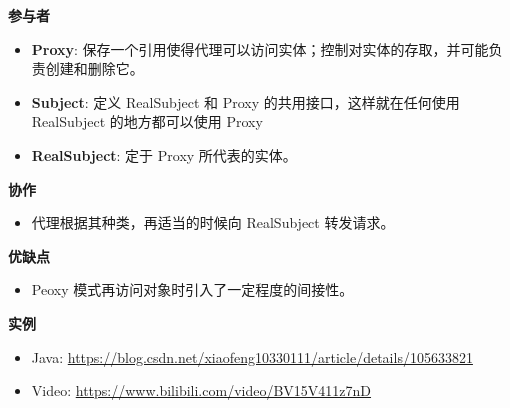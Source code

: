 \noindent\textbf{参与者}

\begin{itemize}
    \item \textbf{Proxy}: 保存一个引用使得代理可以访问实体；控制对实体的存取，并可能负责创建和删除它。
    \item \textbf{Subject}: 定义 RealSubject 和 Proxy 的共用接口，这样就在任何使用 RealSubject 的地方都可以使用 Proxy
    \item \textbf{RealSubject}: 定于 Proxy 所代表的实体。
\end{itemize}

\noindent\textbf{协作}

\begin{itemize}
    \item 代理根据其种类，再适当的时候向 RealSubject 转发请求。
\end{itemize}

\noindent\textbf{优缺点}

\begin{itemize}
    \item Peoxy 模式再访问对象时引入了一定程度的间接性。
\end{itemize}

\noindent\textbf{实例}

\begin{itemize}
    \item Java: \url{https://blog.csdn.net/xiaofeng10330111/article/details/105633821}
    \item Video: \url{https://www.bilibili.com/video/BV15V411z7nD}
\end{itemize}



\newpage